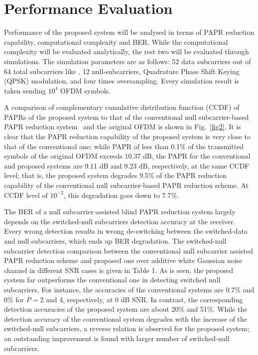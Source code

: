 \documentclass[journal,comsoc]{IEEEtran}
\begin{document}
\section{Performance Evaluation}
Performance of the proposed system will be analysed in terms of PAPR reduction capability, computational complexity and BER. While the computational complexity will be evaluated analytically, the rest two will be evaluated through simulations. The simulation parameters are as follows: 52 data subcarriers out of 64 total subcarriers like \cite{IEEEhowto:sabbir3}, 12 null-subcarriers, Quadrature Phase Shift Keying (QPSK) modulation, and four times oversampling. Every simulation result is taken sending $10^4$ OFDM symbols.

   A comparison of complementary cumulative distribution function (CCDF) of PAPRs of the proposed system to that of the conventional null subcarrier-based PAPR reduction system~\cite{IEEEhowto:wong1} and the original OFDM is shown in Fig.~\ref{fig2}. It is clear that the PAPR reduction capability of the proposed system is very close to that of the conventional one; while PAPR of less than 0.1\% of the transmitted symbols of the original OFDM exceeds 10.37 dB, the PAPR for the conventional and proposed systems are 9.11 dB and 9.23 dB, respectively, at the same CCDF level; that is, the proposed system degrades 9.5\% of the PAPR reduction capability of the conventional null subcarrier-based PAPR reduction scheme. At CCDF level of $10^{-2}$, this degradation goes down to 7.7\%.

   The BER of a null subcarrier-assisted blind PAPR reduction system largely depends on the switched-null subcarriers detection accuracy at the receiver. Every wrong detection results in wrong de-switching between the switched-data and null subcarriers, which ends up BER degradation. The switched-null subcarrier detection comparison between the conventional null subcarrier assisted PAPR reduction scheme and proposed one over additive white Gaussian noise channel in different SNR cases is given in Table 1. As is seen, the proposed system far outperforms the conventional one in detecting switched null subcarriers. For instance, the accuracies of the conventional systems are 0.7\% and 0\% for $P=$2 and 4, respectively, at 0 dB SNR. In contrast, the corresponding detection accuracies of the proposed system are about 20\% and 51\%. While the detection accuracy of the conventional system degrades with the increase of the switched-null subcarriers, a reverse relation is observed for the proposed system; an outstanding improvement is found with larger number of switched-null subcarriers.
   
\end{document}
